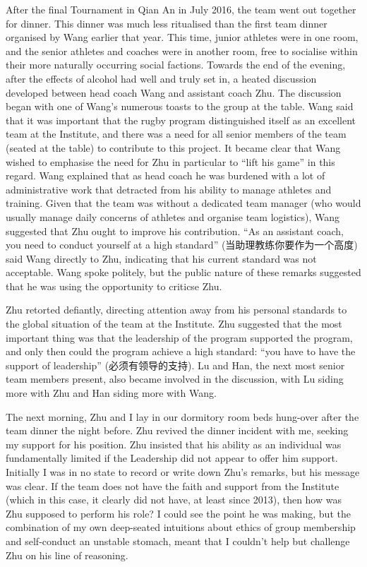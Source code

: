 \begin{CJK}{UTF8}{gbsn}
After the final Tournament in Qian An in July 2016, the team went out together for dinner.  This dinner was much less ritualised than the first team dinner organised by Wang earlier that year.  This time,  junior athletes were in one room, and the senior athletes and coaches were in another room, free to socialise within their more naturally occurring social factions.  Towards the end of the evening, after the effects of alcohol had well and truly set in, a heated discussion developed between head coach Wang and assistant coach Zhu. The discussion began with one of Wang's numerous toasts to the group at the table.  Wang said that it was important that the rugby program distinguished itself as an excellent team at the Institute, and there was a need for all senior members of the team (seated at the table) to contribute to this project.  It became clear that Wang wished to emphasise the need for Zhu in particular to ``lift his game'' in this regard. Wang explained that as head coach he was burdened with a lot of administrative work that detracted from his ability to manage athletes and training.  Given that the team was without a dedicated team manager (who would usually manage daily concerns of athletes and organise team logistics), Wang suggested that Zhu ought to improve his contribution. ``As an assistant coach, you need to conduct yourself at a high standard'' (当助理教练你要作为一个高度) said Wang directly to Zhu, indicating that his current standard was not acceptable. Wang spoke politely, but the public nature of these remarks suggested that he was using the opportunity to criticse Zhu.

Zhu retorted defiantly, directing attention away from his personal standards to the global situation of the team at the Institute.  Zhu suggested that the most important thing was that the leadership of the program supported the program, and only then could the program achieve a high standard: ``you have to have the support of leadership'' (必须有领导的支持).  Lu and Han, the next most senior team members present, also became involved in the discussion, with Lu siding more with Zhu and Han siding more with Wang.

The next morning, Zhu and I lay in our dormitory room beds hung-over after the team dinner the night before.  Zhu revived the dinner incident with me, seeking my support for his position.  Zhu insisted that his ability as an individual was fundamentally limited if the Leadership did not appear to offer him support.  Initially I was in no state to record or write down Zhu's remarks, but his message was clear. If the team does not have the faith and support from the Institute (which in this case, it clearly did not have, at least since 2013), then how was Zhu supposed to perform his role?   I could see the point he was making, but the combination of my own deep-seated intuitions about ethics of group membership and self-conduct an unstable stomach, meant that I couldn't help but challenge Zhu on his line of reasoning.


\end{CJK}
